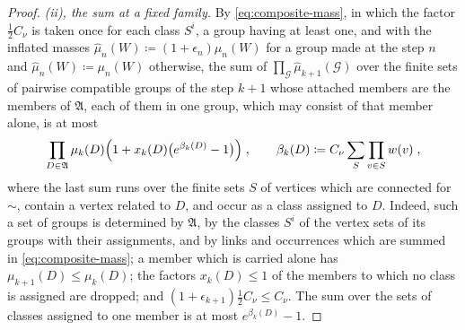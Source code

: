 \documentclass[11pt]{preprint}
\numberwithin{equation}{section}
\theoremstyle{definition}
\theoremstyle{remark}
\theoremstyle{plain}
\begin{document}
\begin{proof}
\emph{(ii), the sum at a fixed family.} By \eqref{eq:composite-mass}, in which the factor $\frac12C_\nu$ is taken once for each class $S^i$, a group having at least one, and with the inflated masses $\hat\mu_n(W) \coloneqq (1 + \epsilon_n)\mu_n(W)$ for a group made at the step $n$ and $\hat\mu_n(W) \coloneqq \mu_n(W)$ otherwise, the sum of $\prod_{\mathcal G}\hat\mu_{k+1}(\mathcal G)$ over the finite sets of pairwise compatible groups of the step $k + 1$ whose attached members are the members of $\mathfrak A$, each of them in one group, which may consist of that member alone, is at most
\begin{equation}\label{eq:fixed-family}
    \prod_{D \in \mathfrak A}\mu_k(D)\Bigl(1 + x_k(D)\bigl(e^{\beta_k(D)} - 1\bigr)\Bigr)\;,
    \qquad
    \beta_k(D) \coloneqq C_\nu\sum_S\prod_{v \in S}w(v)\;,
\end{equation}
where the last sum runs over the finite sets $S$ of vertices which are connected for $\sim$, contain a vertex related to $D$, and occur as a class assigned to $D$. Indeed, such a set of groups is determined by $\mathfrak A$, by the classes $S^i$ of the vertex sets of its groups with their assignments, and by links and occurrences which are summed in \eqref{eq:composite-mass}; a member which is carried alone has $\mu_{k+1}(D) \leq \mu_k(D)$; the factors $x_k(D) \leq 1$ of the members to which no class is assigned are dropped; and $(1 + \epsilon_{k+1})\frac12C_\nu \leq C_\nu$. The sum over the sets of classes assigned to one member is at most $e^{\beta_k(D)} - 1$.


\end{proof}
\end{document}

